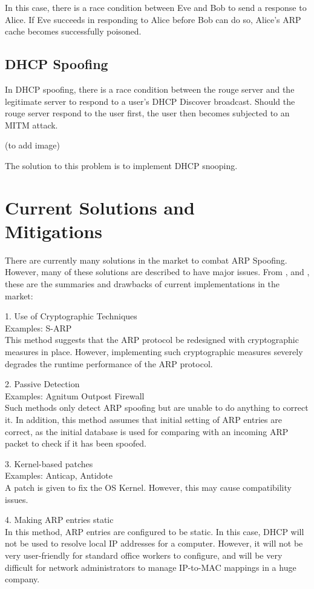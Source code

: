 \documentclass{acm_proc_article-sp}
\begin{document}
In this case, there is a race condition between Eve and Bob to send a response to Alice. If Eve succeeds in responding to Alice before Bob can do so, Alice's ARP cache becomes successfully poisoned. 

\subsection{DHCP Spoofing}
In DHCP spoofing, there is a race condition between the rouge server and the legitimate server to respond to a user's DHCP Discover broadcast. 
Should the rouge server respond to the user first, the user then becomes subjected to an MITM attack. 

(to add image) 

The solution to this problem is to implement DHCP snooping. 

\section{Current Solutions and \\Mitigations}
There are currently many solutions in the market to combat ARP Spoofing. However, many of these solutions are described to have major issues. From \cite{vivek:arp}, \cite{navid:arp2} and \cite{goldendeep:arp3},  these are the summaries and drawbacks of current implementations in the market:

1. Use of Cryptographic Techniques \\
Examples: S-ARP \\
This method suggests that the ARP protocol be redesigned with cryptographic measures in place. However, implementing such cryptographic measures severely degrades the runtime performance of the ARP protocol. 

2. Passive Detection \\
Examples: Agnitum Outpost Firewall\\
Such methods only detect ARP spoofing but are unable to do anything to correct it. In addition, this method assumes that initial setting of ARP entries are correct, as the initial database is used for comparing with an incoming ARP packet to check if it has been spoofed. 

3. Kernel-based patches\\
Examples: Anticap, Antidote \\
A patch is given to fix the OS Kernel. However, this may cause compatibility issues. 

4. Making ARP entries static\\ 
In this method, ARP entries are configured to be static. In this case, DHCP will not be used to resolve local IP addresses for a computer. However, it will not be very user-friendly for standard office workers to configure, and will be very difficult for network administrators to manage IP-to-MAC mappings in a huge company. 
\end{document}
